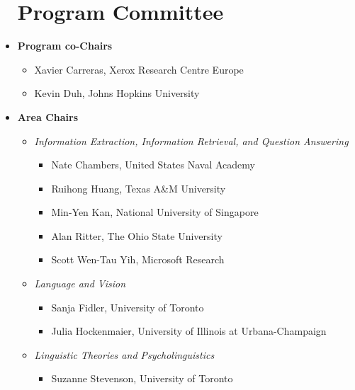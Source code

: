 \begin{itemize}[itemsep=7pt, leftmargin=0cm, label={}]
\section{Program Committee}

\item \textbf{Program co-Chairs}

\begin{itemize}[nosep, leftmargin=0.5cm, label={}]
\item Xavier Carreras, Xerox Research Centre Europe 
\item Kevin Duh, Johns Hopkins University 
\end{itemize}
\item \textbf{Area Chairs}

\begin{itemize}[leftmargin=0.5cm, itemsep=6pt, label={}]
\item \emph{Information Extraction, Information Retrieval, and Question Answering}

\begin{itemize}[nosep, leftmargin=0.5cm, label={}]
\item Nate Chambers, United States Naval Academy 
\item    Ruihong Huang, Texas A\&M University 
\item    Min-Yen Kan, National University of Singapore 
\item    Alan Ritter, The Ohio State University 
\item    Scott Wen-Tau Yih, Microsoft Research 
\end{itemize}

\item \emph{Language and Vision}

\begin{itemize}[nosep, leftmargin=0.5cm, label={}]
\item Sanja Fidler, University of Toronto 
\item    Julia Hockenmaier, University of Illinois at Urbana-Champaign
\end{itemize}

\item \emph{Linguistic Theories and Psycholinguistics}

\begin{itemize}[nosep, leftmargin=0.5cm, label={}]
\item Suzanne Stevenson, University of Toronto
\end{itemize}


\end{itemize}
\end{itemize}
